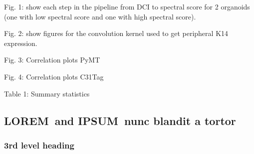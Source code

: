 \documentclass[10pt,letterpaper]{article}
\newlength\savedwidth
\newcommand\thickhline{\noalign{\global\savedwidth\arrayrulewidth\global\arrayrulewidth 2pt}%
\hline
\noalign{\global\arrayrulewidth\savedwidth}}
\newcommand{\lorem}{{\bf LOREM}}
\newcommand{\ipsum}{{\bf IPSUM}}
\begin{document}
Fig. 1: show each step in the pipeline from DCI to spectral score for 2 organoids (one with low spectral score and one with high spectral score).

Fig. 2: show figures for the convolution kernel used to get peripheral K14 expression.

Fig. 3: Correlation plots PyMT

Fig. 4: Correlation plots C31Tag

Table 1: Summary statistics

\subsection*{\lorem\ and \ipsum\ nunc blandit a tortor}
\subsubsection*{3rd level heading} 
 
\end{document}
